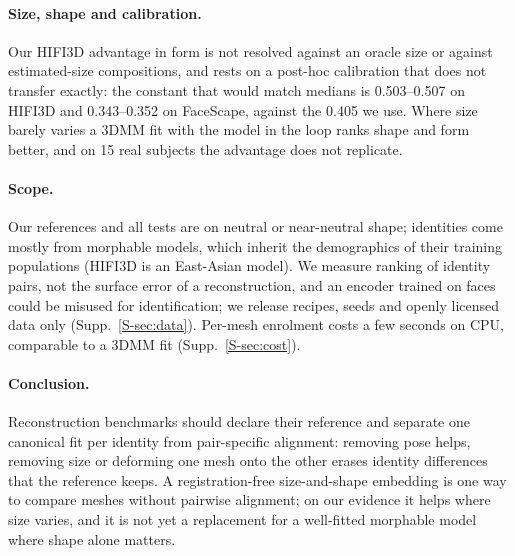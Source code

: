 \documentclass[10pt,twocolumn,letterpaper]{article}
\begin{document}
\paragraph{Size, shape and calibration.} Our HIFI3D advantage in form is not resolved against an oracle size or against estimated-size compositions, and rests on a post-hoc calibration that does not transfer exactly: the constant that would match medians is 0.503--0.507 on HIFI3D and 0.343--0.352 on FaceScape, against the 0.405 we use. Where size barely varies a 3DMM fit with the model in the loop ranks shape and form better, and on 15 real subjects the advantage does not replicate.

\paragraph{Scope.} Our references and all tests are on neutral or near-neutral shape; identities come mostly from morphable models, which inherit the demographics of their training populations (HIFI3D is an East-Asian model). We measure ranking of identity pairs, not the surface error of a reconstruction, and an encoder trained on faces could be misused for identification; we release recipes, seeds and openly licensed data only (Supp.~\ref{S-sec:data}). Per-mesh enrolment costs a few seconds on CPU, comparable to a 3DMM fit (Supp.~\ref{S-sec:cost}).

\paragraph{Conclusion.} Reconstruction benchmarks should declare their reference and separate one canonical fit per identity from pair-specific alignment: removing pose helps, removing size or deforming one mesh onto the other erases identity differences that the reference keeps. A registration-free size-and-shape embedding is one way to compare meshes without pairwise alignment; on our evidence it helps where size varies, and it is not yet a replacement for a well-fitted morphable model where shape alone matters.

{\small


}
\end{document}
